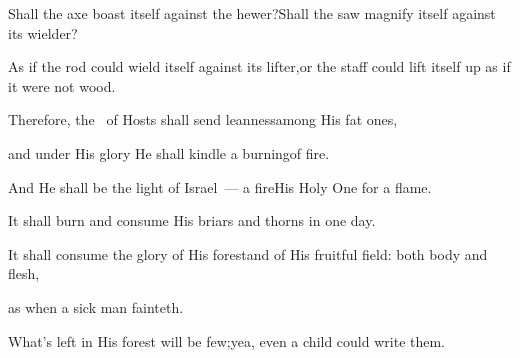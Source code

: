 \begin{inparaenum}
  \pa{} Shall the axe boast itself against the hewer?\pa{}Shall the saw magnify itself against its wielder?%

  \pa{}As if the rod could wield itself against its lifter,\pa{}or the staff could lift itself up as if it were not wood.%

  \pa{} Therefore, the \lord\ of Hosts shall send leanness\pa{}among His fat ones,%

  \pa{}and under His glory He shall kindle a burning\pa{}of fire.%

  \pa{} And He shall be the light of Israel~--- a fire\pa{}His Holy One for a flame.%

  \pa{}It shall burn and consume His briars and thorns in one day.%

  \pa{} It shall consume the glory of His forest\pa{}and of His fruitful field: both body and flesh,%

  \pa{}as when a sick man fainteth.%

  \pa{} What's left in His forest will be few;\pa{}yea, even a child could write them.%
\end{inparaenum}
